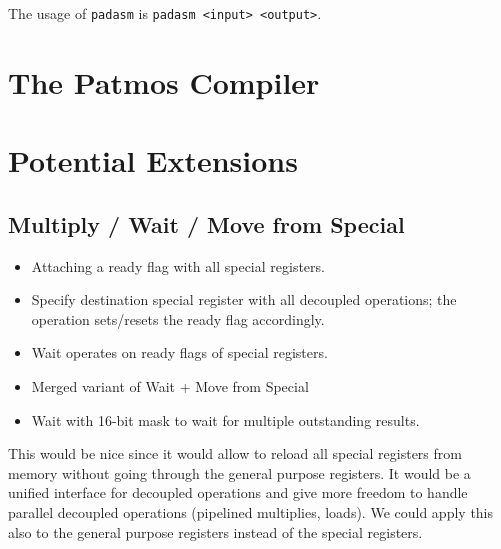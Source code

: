 \documentclass[a4paper,fontsize=10pt,twoside,DIV15,BCOR12mm,headinclude=true,footinclude=false,pagesize,bibtotoc]{scrbook}
\newcommand{\comment}[3]{

\textsf{\textbf{#1}} {\color{#3}#2}}
\newcommand{\stefan}[1]{\comment{Stefan}{#1}{RoyalPurple}}
\renewcommand{\stefan}[1]{}
\begin{document}
The usage of \texttt{padasm} is \texttt{padasm <input> <output>}.





\chapter{The Patmos Compiler}
\label{sec:compiler}




\chapter{Potential Extensions}

\section{Multiply / Wait / Move from Special}

\begin{itemize}
  \item Attaching a ready flag with all special registers.
  \item Specify destination special register with all decoupled operations; the
        operation sets/resets the ready flag accordingly.
  \item Wait operates on ready flags of special registers.
  \item Merged variant of Wait + Move from Special
  \item Wait with 16-bit mask to wait for multiple outstanding results.
\end{itemize}

This would be nice since it would allow to reload all special registers from
memory without going through the general purpose registers. It would be a
unified interface for decoupled operations and give more freedom to handle
parallel decoupled operations (pipelined multiplies, loads). We could apply this
also to the general purpose registers instead of the special registers.

\stefan{I think it makes more sense to use the ready flags with the general purpose registers. Then we can simply replace
all blocking and decoupled loads with special move by one unified load to a general purpose register. This however means
that all operations can potentially stall.}
\end{document}
